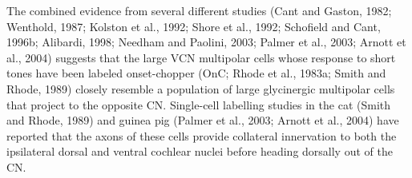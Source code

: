 
The combined evidence from several
 different studies (Cant and Gaston, 1982; Wenthold, 1987;
 Kolston et al., 1992; Shore et al., 1992; Schofield and Cant,
 1996b; Alibardi, 1998; Needham and Paolini, 2003;
 Palmer et al., 2003; Arnott et al., 2004) suggests that the
 large VCN multipolar cells whose response to short tones
 have been labeled onset-chopper (OnC; Rhode et al., 1983a;
 Smith and Rhode, 1989) closely resemble a population of
 large glycinergic multipolar cells that project to the opposite CN. Single-cell labelling studies in the cat (Smith and
 Rhode, 1989) and guinea pig (Palmer et al., 2003; Arnott
 et al., 2004) have reported that the axons of these cells
 provide collateral innervation to both the ipsilateral dorsal and ventral cochlear nuclei before heading dorsally out
 of the CN. 





